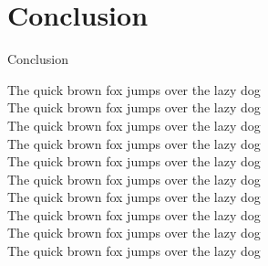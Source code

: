 \documentclass[A4,svgnames,9pt,aspectratio=169]{beamer}
\begin{document}
\section{Conclusion}
\begin{frame}{Conclusion}

    {\tiny         The quick brown fox jumps over the lazy dog}\\
    {\scriptsize   The quick brown fox jumps over the lazy dog}\\
    {\footnotesize The quick brown fox jumps over the lazy dog}\\
    {\small        The quick brown fox jumps over the lazy dog}\\
    {\normalsize   The quick brown fox jumps over the lazy dog}\\
    {\large        The quick brown fox jumps over the lazy dog}\\
    {\Large        The quick brown fox jumps over the lazy dog}\\
    {\LARGE        The quick brown fox jumps over the lazy dog}\\
    {\huge         The quick brown fox jumps over the lazy dog}\\
    {\Huge         The quick brown fox jumps over the lazy dog}

\end{frame}


\frame{\merci}

\end{document}
